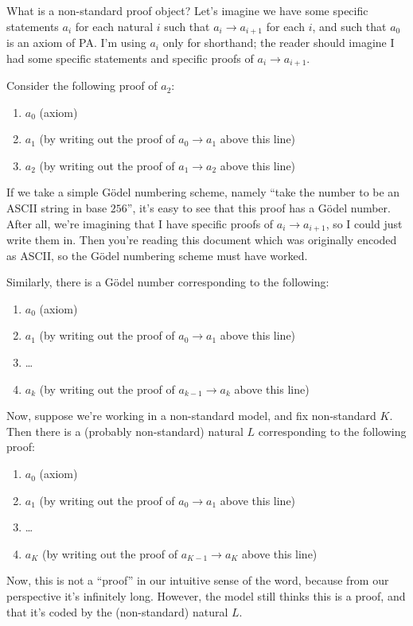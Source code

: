 \documentclass[11pt]{amsart}
\begin{document}
What is a non-standard proof object?
Let's imagine we have some specific statements $a_i$ for each natural $i$ such that $a_i \to a_{i+1}$ for each $i$, and such that $a_0$ is an axiom of PA.
I'm using $a_i$ only for shorthand; the reader should imagine I had some specific statements and specific proofs of $a_i \to a_{i+1}$.

Consider the following proof of $a_2$:
\begin{enumerate}
\item $a_0$ (axiom)
\item $a_1$ (by writing out the proof of $a_0 \to a_1$ above this line)
\item $a_2$ (by writing out the proof of $a_1 \to a_2$ above this line)
\end{enumerate}

If we take a simple G\"odel numbering scheme, namely ``take the number to be an ASCII string in base $256$'',
it's easy to see that this proof has a G\"odel number.
After all, we're imagining that I have specific proofs of $a_i \to a_{i+1}$, so I could just write them in.
Then you're reading this document which was originally encoded as ASCII, so the G\"odel numbering scheme must have worked.

Similarly, there is a G\"odel number corresponding to the following:
\begin{enumerate}
\item $a_0$ (axiom)
\item $a_1$ (by writing out the proof of $a_0 \to a_1$ above this line)
\item \dots
\item $a_k$ (by writing out the proof of $a_{k-1} \to a_k$ above this line)
\end{enumerate}

Now, suppose we're working in a non-standard model, and fix non-standard $K$.
Then there is a (probably non-standard) natural $L$ corresponding to the following proof:
\begin{enumerate}
\item $a_0$ (axiom)
\item $a_1$ (by writing out the proof of $a_0 \to a_1$ above this line)
\item \dots
\item $a_K$ (by writing out the proof of $a_{K-1} \to a_K$ above this line)
\end{enumerate}

Now, this is not a ``proof'' in our intuitive sense of the word, because from our perspective it's infinitely long.
However, the model still thinks this is a proof, and that it's coded by the (non-standard) natural $L$.
\end{document}
